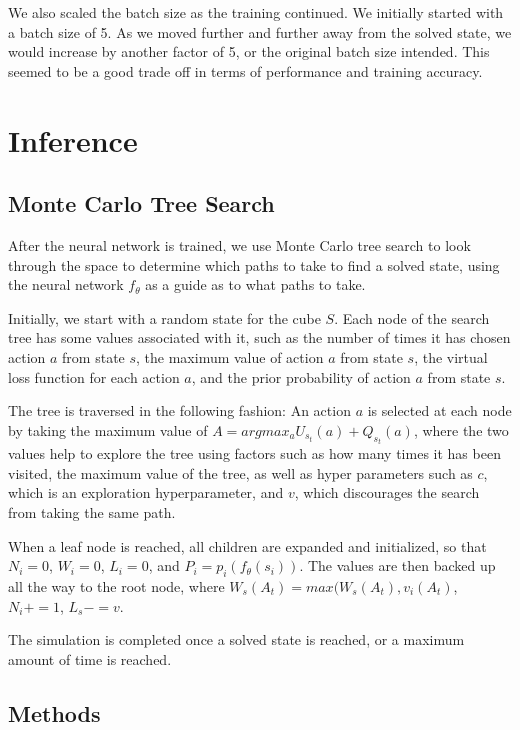 \documentclass[10pt,twocolumn,letterpaper]{article}
\begin{document}
We also scaled the batch size as the training continued. We initially started with a batch size of 5. As we moved further and further away from the solved state, we would increase by another factor of 5, or the original batch size intended. This seemed to be a good trade off in terms of performance and training accuracy.


\section{Inference}

\subsection{Monte Carlo Tree Search}

After the neural network is trained, we use Monte Carlo tree search to look through the space to determine which paths to take to find a solved state, using the neural network $f_\theta$ as a guide as to what paths to take. 

Initially, we start with a random state for the cube $S$. Each node of the search tree has some values associated with it, such as the number of times it has chosen action $a$ from state $s$, the maximum value of action $a$ from state $s$, the virtual loss function for each action $a$, and the prior probability of action $a$ from state $s$.

The tree is traversed in the following fashion: An action $a$ is selected at each node by taking the maximum value of $A=argmax_a U_{s_{t}}(a) + Q_{s_{t}}(a) $, where the two values help to explore the tree using factors such as how many times it has been visited, the maximum value of the tree, as well as hyper parameters such as $c$, which is an exploration hyperparameter, and $v$, which discourages the search from taking the same path.

When a leaf node is reached, all children are expanded and initialized, so that $N_i = 0$, $W_i = 0$, $L_i = 0$, and $P_i = p_i(f_\theta (s_i))$. The values are  then backed up all the way to the root node, where $W_s(A_t) = max(W_s(A_t), v_i(A_t)$, $N_i += 1$, $L_s -= v$.

The simulation is completed once a solved state is reached, or a maximum amount of time is reached.

\subsection{Methods}
\end{document}
